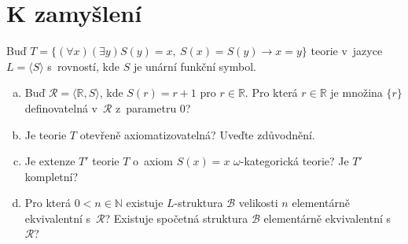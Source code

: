 \section*{K zamyšlení}


\begin{problem}

    Buď $T=\{(\forall x)(\exists y) S(y)=x,\ S(x)=S(y)\to x=y\}$ teorie v~jazyce $L=\langle S\rangle$ s~rovností, kde $S$ je unární funkční symbol.
    \begin{enumerate}[(a)]
        \item Buď $\mathcal{R}=\langle\mathbb{R},S\rangle$, kde $S(r)=r+1$ pro $r\in\mathbb{R}$. Pro která $r\in\mathbb{R}$ je množina $\{r\}$ definovatelná v~$\mathcal{R}$ z~parametru $0$?
        \item Je teorie $T$ otevřeně axiomatizovatelná? Uveďte zdůvodnění.
        \item Je extenze $T'$ teorie $T$ o~axiom $S(x)=x$ $\omega$-kategorická teorie? Je $T'$ kompletní?
        \item Pro která $0<n\in\mathbb{N}$ existuje $L$-struktura $\mathcal{B}$ velikosti $n$ elementárně ekvivalentní s~$\mathcal{R}$? Existuje spočetná struktura $\mathcal{B}$ elementárně ekvivalentní s~$\mathcal{R}$?
    \end{enumerate}

\end{problem}



